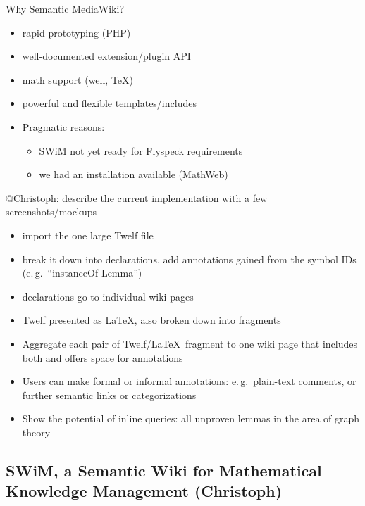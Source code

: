 \documentclass{llncs}
\begin{document}
Why Semantic MediaWiki\cite{kroetzsch06:semantic-mediawiki}?
\begin{itemize}
\item rapid prototyping (PHP)
\item well-documented extension/plugin API
\item math support (well, \TeX)
\item powerful and flexible templates/includes
\item Pragmatic reasons:
  \begin{itemize}
  \item SWiM not yet ready for Flyspeck requirements
  \item we had an installation available (MathWeb)
  \end{itemize}
\end{itemize}

\begin{todo}{@Christoph: describe the current implementation with a few
    screenshots/mockups}
  \begin{itemize}
  \item import the one large Twelf file
  \item break it down into declarations, add annotations gained from the symbol IDs
    (e.\,g.\ ``instanceOf Lemma'')
  \item declarations go to individual wiki pages
  \item Twelf presented as \LaTeX, also broken down into fragments
  \item Aggregate each pair of Twelf/\LaTeX\ fragment to one wiki page that includes both
    and offers space for annotations
  \item Users can make formal or informal annotations: e.\,g.\ plain-text comments, or
    further semantic links or categorizations
  \item Show the potential of inline queries: all unproven lemmas in the area of graph
    theory
  \end{itemize}
\end{todo}

\subsection{SWiM, a Semantic Wiki for Mathematical Knowledge Management (Christoph)}
\label{sec:swim}
\end{document}
